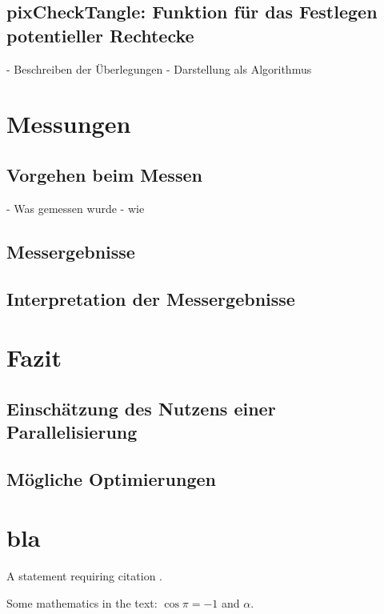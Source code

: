 \documentclass[
10pt, %
a4paper, %
oneside, %
headinclude,footinclude, %
BCOR5mm, %
]{scrartcl}
\begin{document}
\subsection{pixCheckTangle: Funktion für das Festlegen potentieller Rechtecke}

- Beschreiben der Überlegungen
- Darstellung als Algorithmus

\section{Messungen}
\subsection{Vorgehen beim Messen}
- Was gemessen wurde 
- wie
\subsection{Messergebnisse}

\subsection{Interpretation der Messergebnisse}

\section{Fazit}
\subsection{Einschätzung des Nutzens einer Parallelisierung}
\subsection{Mögliche Optimierungen}

\section{bla}

A statement requiring citation \cite{Figueredo:2009dg}.

\lipsum[1-3] %

Some mathematics in the text: $\cos\pi=-1$ and $\alpha$.
 
\end{document}
